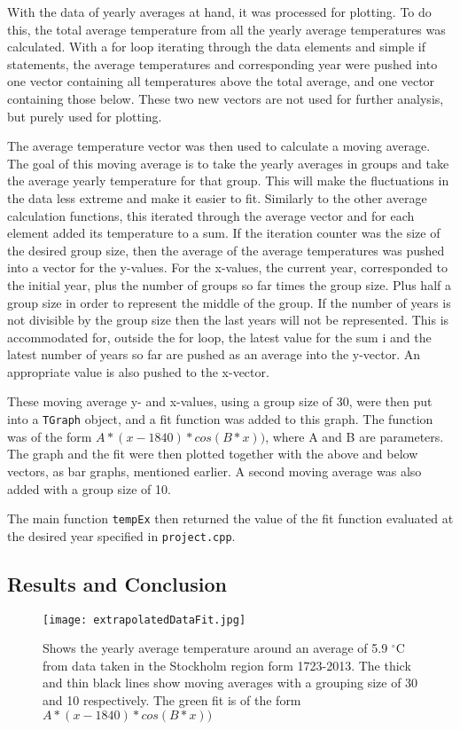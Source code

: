 With the data of yearly averages at hand, it was processed for plotting. To do this, the total average temperature from all the yearly average temperatures was calculated. With a for loop iterating through the data elements and simple if statements, the average temperatures and corresponding year were pushed into one vector containing all temperatures above the total average, and one vector containing those below. These two new vectors are not used for further analysis, but purely used for plotting.

The average temperature vector was then used to calculate a moving average. The goal of this moving average is to take the yearly averages in groups and take the average yearly temperature for that group. This will make the fluctuations in the data less extreme and make it easier to fit. Similarly to the other average calculation functions, this iterated through the average vector and for each element added its temperature to a sum. If the iteration counter was the size of the desired group size, then the average of the average temperatures was pushed into a vector for the y-values. For the x-values, the current year, corresponded to the initial year, plus the number of groups so far times the group size. Plus half a group size in order to represent the middle of the group. If the number of years is not divisible by the group size then the last years will not be represented. This is accommodated for, outside the for loop, the latest value for the sum i and the latest number of years so far are pushed as an average into the y-vector. An appropriate value is also pushed to the x-vector.

These moving average y- and x-values, using a group size of 30, were then put into a \texttt{TGraph} object, and a fit function was added to this graph. The function was of the form $A*(x-1840)*cos(B*x))$, where A and B are parameters. The graph and the fit were then plotted together with the above and below vectors, as bar graphs, mentioned earlier. A second moving average was also added with a group size of 10.

The main function \texttt{tempEx} then returned the value of the fit function evaluated at the desired year specified in \texttt{project.cpp}.

\subsection{Results and Conclusion}

\begin{figure}[h!]
\begin{center}
\texttt{[image: extrapolatedDataFit.jpg]}
\caption{\label{fig:extrap1}Shows the yearly average temperature around an average of 5.9 $^{\circ}$C from data taken in the Stockholm region form 1723-2013. The thick and thin black lines show moving averages with a grouping size of 30 and 10 respectively. The green fit is of the form $A*(x-1840)*cos(B*x))$}
\end{center}
\end{figure}

